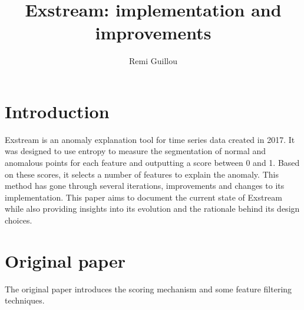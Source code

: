 \documentclass[11pt]{article}
\title{Exstream: implementation and improvements}
\author[1]{Remi Guillou}
\begin{document}
\maketitle

\section{Introduction}
Exstream is an anomaly explanation tool for time series data created in 2017\cite{Exstream_origin}. It was designed to use entropy to measure the segmentation of normal and anomalous points for each feature and outputting a score between 0 and 1. Based on these scores, it selects a number of features to explain the anomaly. This method has gone through several iterations, improvements and changes to its implementation. This paper aims to document the current state of Exstream while also providing insights into its evolution and the rationale behind its design choices.


\section{Original paper}
The original paper \cite{Exstream_origin} introduces the scoring mechanism and some feature filtering techniques.
\end{document}
